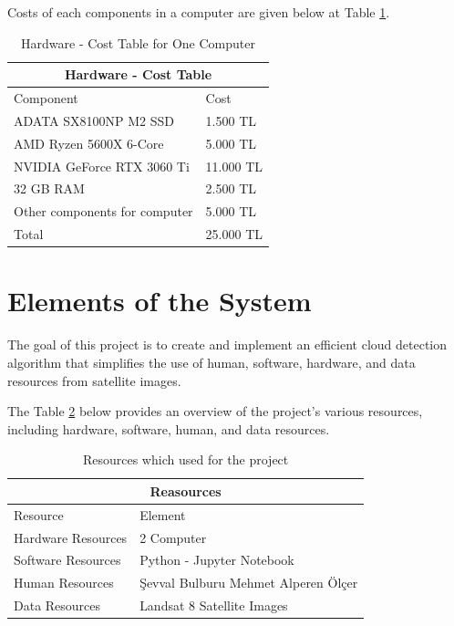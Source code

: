 Costs of each components in a computer are given below at Table \ref{ch}.

\begin{table}[htp]
    \centering

    \begin{tabular}{ |p{6cm}||p{2cm}|}
     \hline
     \multicolumn{2}{|c|}{Hardware - Cost Table} \\
     \hline
     Component & Cost\\
     \hline
     \hline
     ADATA SX8100NP M2 SSD     &   1.500 TL\\
     \hline
     AMD Ryzen 5600X 6-Core   &     5.000 TL\\
     \hline
     NVIDIA GeForce RTX 3060 Ti  &  11.000 TL\\
     \hline
     32 GB RAM       &     2.500 TL\\
     \hline
     Other components for computer &   5.000 TL\\
     \hline
     \hline
     Total       &         25.000 TL\\
     \hline
    \end{tabular}

    \caption{Hardware - Cost Table for One Computer}
    \label{ch}
\end{table}


\section{Elements of the System}
The goal of this project is to create and implement an efficient cloud detection algorithm that simplifies the use of human, software, hardware, and data resources from satellite images.

The Table \ref{element} below provides an overview of the project's various resources, including hardware, software, human, and data resources.
\hfill \break
\begin{table}[htp]
    \centering

    \begin{tabular}{ |p{6cm}||p{6cm}|}
     \hline
     \multicolumn{2}{|c|}{Reasources} \\
     \hline
      Resource & Element\\
     \hline
     \hline
     Hardware Resources  & 2 Computer\\
     \hline
    Software Resources   &    Python - Jupyter Notebook\\
     \hline
     Human Resources  &  Şevval Bulburu
                         Mehmet Alperen Ölçer \\
     \hline
     Data Resources       &    Landsat 8 Satellite Images\\
     \hline
    \end{tabular}
    \caption{Resources which used for the project}
    \label{element}
\end{table}